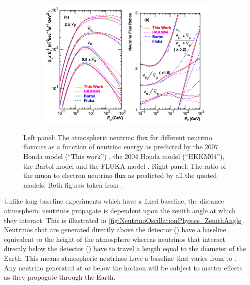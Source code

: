 \begin{figure}[h]
  \begin{subfigure}[t]{0.80\textwidth}
    \includegraphics[width=\textwidth, trim={0mm 0mm 0mm 0mm}, clip,page=1]{Figures/Theory/AtmosphericNuFlux.pdf}
  \end{subfigure}
  \caption{Left panel: The atmospheric neutrino flux for different neutrino flavours as a function of neutrino energy as predicted by the 2007 Honda model (``This work'') \cite{Honda_2007}, the 2004 Honda model (``HKKM04'')\cite{PhysRevD.70.043008}, the Bartol model \cite{Barr_2004} and the FLUKA model \cite{etde_20239111}. Right panel: The ratio of the muon to electron neutrino flux as predicted by all the quoted models. Both figures taken from \cite{Honda_2007}.}
  \label{fig:NeutrinoOscillationPhysics_AtmosphericNeutrinoFlux}
\end{figure}

Unlike long-baseline experiments which have a fixed baseline, the distance atmospheric neutrinos propagate is dependent upon the zenith angle at which they interact. This is illustrated in \autoref{fig:NeutrinoOscillationPhysics_ZenithAngle}. Neutrinos that are generated directly above the detector () have a baseline equivalent to the height of the atmosphere whereas neutrinos that interact directly below the detector () have to travel a length equal to the diameter of the  Earth. This means atmospheric neutrinos have a baseline that varies from  to . Any neutrino generated at or below the horizon will be subject to matter effects as they propagate through the Earth.

